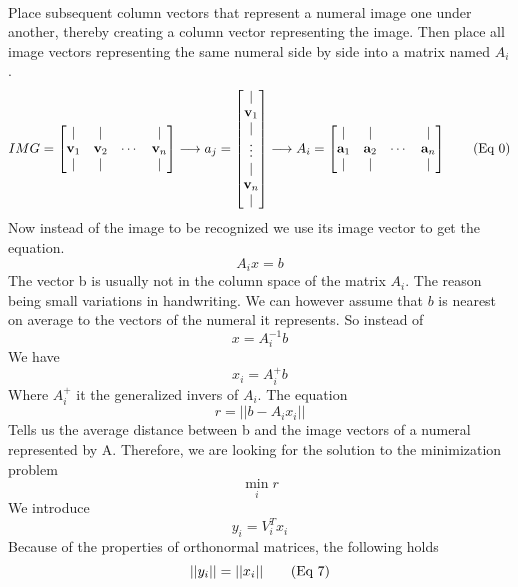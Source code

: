 \documentclass{article}
\begin{document}
	\paragraph{}
	Place subsequent column vectors that represent a numeral image one under another, thereby creating a column vector representing the image.
	Then place all image vectors representing the same numeral side by side into a matrix named $A_i$. 
	\[
		IMG = \begin{bmatrix}
			\mid & \mid & & \mid \\
			{\bf v}_{1} & {\bf v}_{2} & \cdots & {\bf v}_{n}\\
			\mid & \mid & & \mid \\
			\end{bmatrix}
		\longrightarrow
		a_j = \begin{bmatrix}
			\mid   \\
			{\bf v}_{1} \\
			 \mid \\
			 \vdots \\
			\mid   \\
			{\bf v}_{n} \\
			 \mid \\
			\end{bmatrix}
		\longrightarrow
		A_i = \begin{bmatrix}
			\mid & \mid & & \mid \\
			{\bf a}_{1} & {\bf a}_{2} & \cdots & {\bf a}_{n}\\
			\mid & \mid & & \mid \\
			\end{bmatrix}
		\tag{Eq 0}
	\]
	Now instead of the image to be recognized we use its image vector to get the equation.
	\[
		A_ix = b \tag{Eq 1}
	\]
	The vector b is usually not in the column space of the matrix $A_i$. The reason being small variations in handwriting.
	We can however assume that $b$ is nearest on average to the vectors of the numeral it represents. So instead of
	\[
		x = A_i^{-1}b \tag{Eq 2}
	\]
	We have
	\[
		x_i = A_i^+b \tag{Eq 3}
	\]
	Where $A_i^+$ it the generalized invers of $A_i$.
	The equation 
	\[
		r = ||b - A_ix_i|| \tag{Eq 4}
	\]
	Tells us the average distance between b and the image vectors of a numeral represented by A.
	Therefore, we are looking for the solution to the minimization problem
	\[
		\min_{i}  r \tag{Eq 5}
	\]
	We introduce
	\[
		y_i = V_i^Tx_i \tag{Eq 6}
	\]
	Because of the properties of orthonormal matrices, the following holds
	\[
		||y_i|| = ||x_i||  \tag{Eq 7}\\
	\]
\end{document}
